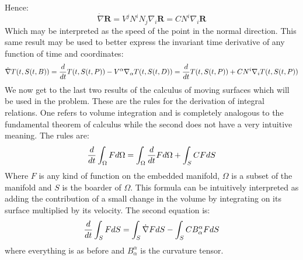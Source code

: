 \documentclass[../main.tex]{subfiles}
\begin{document}
        Hence:
        \begin{equation}
            \dot{\nabla}\mathbf{R}=V^jN^iN_j\nabla_i\mathbf{R}=CN^i\nabla_i\mathbf{R}
        \end{equation}
        Which may be interpreted as the speed of the point in the normal direction. This same result may be used to better express the invariant time derivative of any function of time and coordinates:
        \begin{equation}
        \dot{\nabla}T(t,S(t,B))=\dfrac{d}{dt}T(t,S(t,P))-V^\alpha\nabla_\alpha T(t,S(t,D))=\dfrac{d}{dt}T(t,S(t,P))+CN^i\nabla_iT(t,S(t,P))
        \end{equation}
        We now get to the last two results of the calculus of moving surfaces which will be used in the problem. These are the rules for the derivation of integral relations. One refers to volume integration and is completely analogous to the fundamental theorem of calculus while the second does not have a very intuitive meaning. The rules are:
        \begin{equation}
            \dfrac{d}{dt}\int_\Omega Fd\Omega = \int_\Omega \dfrac{d}{dt}Fd\Omega + \int_SCFdS
        \end{equation}
        Where $F$ is any kind of function on the embedded manifold, $\Omega $ is a subset of the manifold and $S$ is the boarder of $\Omega$. This formula can be intuitively interpreted as adding the contribution of a small change in the volume by integrating on its surface multiplied by its velocity. The second equation is:
        \begin{equation}
            \dfrac{d}{dt}\int_SFdS=\int_S \dot{\nabla}FdS-\int_SCB_\alpha^\alpha FdS
        \end{equation}
        where everything is as before and $B_\alpha^\alpha$ is the curvature tensor.
\end{document}
